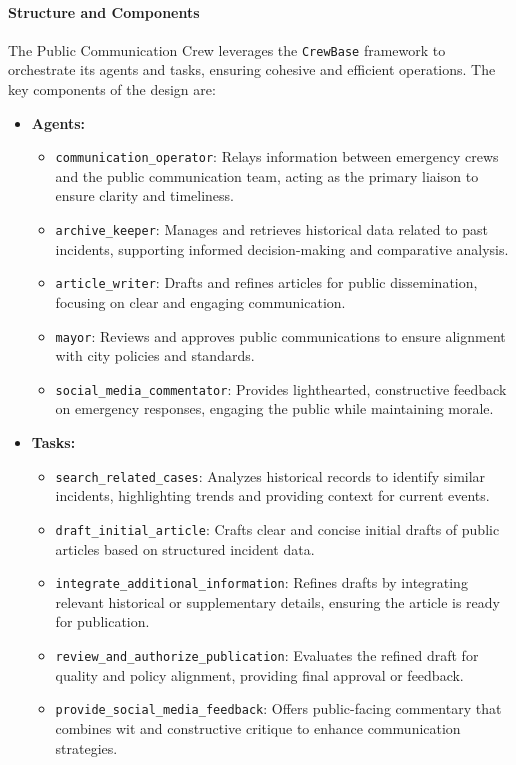 \paragraph{Structure and Components}
The Public Communication Crew leverages the \texttt{CrewBase} framework to orchestrate its agents and tasks, ensuring cohesive and efficient operations. The key components of the design are:

\begin{itemize}
    \item \textbf{Agents:}
    \begin{itemize}
        \item \texttt{communication\_operator}: Relays information between emergency crews and the public communication team, acting as the primary liaison to ensure clarity and timeliness.
        \item \texttt{archive\_keeper}: Manages and retrieves historical data related to past incidents, supporting informed decision-making and comparative analysis.
        \item \texttt{article\_writer}: Drafts and refines articles for public dissemination, focusing on clear and engaging communication.
        \item \texttt{mayor}: Reviews and approves public communications to ensure alignment with city policies and standards.
        \item \texttt{social\_media\_commentator}: Provides lighthearted, constructive feedback on emergency responses, engaging the public while maintaining morale.
    \end{itemize}
    \item \textbf{Tasks:}
    \begin{itemize}
        \item \texttt{search\_related\_cases}: Analyzes historical records to identify similar incidents, highlighting trends and providing context for current events.
        \item \texttt{draft\_initial\_article}: Crafts clear and concise initial drafts of public articles based on structured incident data.
        \item \texttt{integrate\_additional\_information}: Refines drafts by integrating relevant historical or supplementary details, ensuring the article is ready for publication.
        \item \texttt{review\_and\_authorize\_publication}: Evaluates the refined draft for quality and policy alignment, providing final approval or feedback.
        \item \texttt{provide\_social\_media\_feedback}: Offers public-facing commentary that combines wit and constructive critique to enhance communication strategies.

\end{itemize}
\end{itemize}

